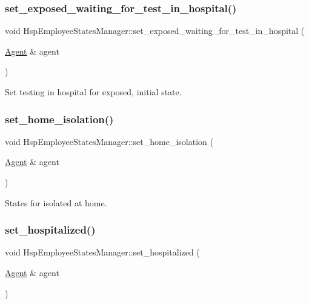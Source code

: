 \subsubsection{\texorpdfstring{set\+\_\+exposed\+\_\+waiting\+\_\+for\+\_\+test\+\_\+in\+\_\+hospital()}{set\_exposed\_waiting\_for\_test\_in\_hospital()}}
{\footnotesize\ttfamily void Hsp\+Employee\+States\+Manager\+::set\+\_\+exposed\+\_\+waiting\+\_\+for\+\_\+test\+\_\+in\+\_\+hospital (\begin{DoxyParamCaption}\item[{\hyperlink{classAgent}{Agent} \&}]{agent }\end{DoxyParamCaption})}



Set testing in hospital for exposed, initial state. 

\mbox{\label{classHspEmployeeStatesManager_ab41695ae171267f0aac57a1d7ddfe154}} 
\subsubsection{\texorpdfstring{set\+\_\+home\+\_\+isolation()}{set\_home\_isolation()}}
{\footnotesize\ttfamily void Hsp\+Employee\+States\+Manager\+::set\+\_\+home\+\_\+isolation (\begin{DoxyParamCaption}\item[{\hyperlink{classAgent}{Agent} \&}]{agent }\end{DoxyParamCaption})}



States for isolated at home. 

\mbox{\label{classHspEmployeeStatesManager_a33035540117578d7a090458c89a7cf33}} 
\subsubsection{\texorpdfstring{set\+\_\+hospitalized()}{set\_hospitalized()}}
{\footnotesize\ttfamily void Hsp\+Employee\+States\+Manager\+::set\+\_\+hospitalized (\begin{DoxyParamCaption}\item[{\hyperlink{classAgent}{Agent} \&}]{agent }\end{DoxyParamCaption})}



